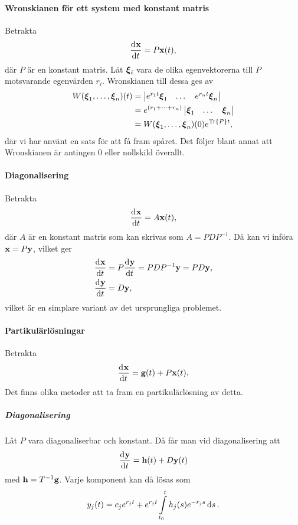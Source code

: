 \paragraph{Wronskianen för ett system med konstant matris}
Betrakta
\begin{align*}
	\dv[]{\vb{x}}{t} (t) = P\vb{x}(t),
\end{align*}
där $P$ är en konstant matris. Låt $\vb*{\xi}_{i}$ vara de olika egenvektorerna till $P$ motsvarande egenvärden $r_{i}$. Wronskianen till dessa ges av
\begin{align*}
	W(\vb*{\xi}_{1}, \dots, \vb*{\xi}_{n})(t) &= \mdet{e^{r_{1}t}\vb*{\xi}_{1} & \dots & e^{r_{n}t}\vb*{\xi}_{n}} \\
	                                          &= e^{(r_{1} + \dots + r_{n})}\mdet{\vb*{\xi}_{1} & \dots & \vb*{\xi}_{n}} \\
	                                          &= W(\vb*{\xi}_{1}, \dots, \vb*{\xi}_{n})(0)e^{\Tr{P}t},
\end{align*}
där vi har använt en sats för att få fram spåret. Det följer blant annat att Wronskianen är antingen $0$ eller nollskild överallt.

\paragraph{Diagonalisering}
Betrakta
\begin{align*}
	\dv[]{\vb{x}}{t} (t) = A\vb{x}(t),
\end{align*}
där $A$ är en konstant matris som kan skrivas som $A = PDP^{-1}$. Då kan vi införa $\vb{x}= P\vb{y}$, vilket ger
\begin{align*}
	\dv[]{\vb{x}}{t} (t) &= P\dv[]{\vb{y}}{t} (t) = PDP^{-1}\vb{y} = PD\vb{y}, \\
	\dv[]{\vb{y}}{t} (t) &= D\vb{y},
\end{align*}
vilket är en simplare variant av det ursprungliga problemet.

\paragraph{Partikulärlösningar}
Betrakta
\begin{align*}
	\dv[]{\vb{x}}{t} (t) = \vb{g}(t) + P\vb{x}(t).
\end{align*}
Det finns olika metoder att ta fram en partikulärlösning av detta.

\subparagraph{Diagonalisering}
Låt $P$ vara diagonaliserbar och konstant. Då får man vid diagonalisering att
\begin{align*}
	\dv[]{\vb{y}}{t} (t) = \vb{h}(t) + D\vb{y}(t)
\end{align*}
med $\vb{h} = T^{-1}\vb{g}$. Varje komponent kan då lösas som
\begin{align*}
	y_{j}(t) = c_{j}e^{r_{j}t} + e^{r_{j}t}\int\limits_{t_{0}}^{t}h_{j}(s)e^{-r_{j}s}\dd{s}.
\end{align*}

